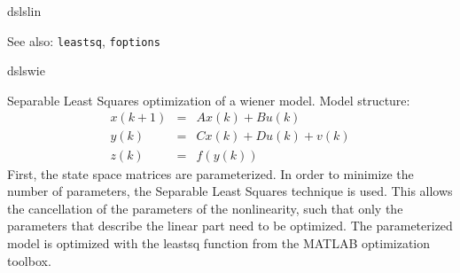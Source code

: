 \documentclass{book}
\newcommand{\foptions}{\texttt{foptions}}
\newcommand{\leastsq}{\texttt{leastsq}}
\begin{document}
\begin{command}{dslslin}
  \begin{seealso}
    See also:   {\leastsq}, {\foptions}
  \end{seealso}
\end{command}%

\begin{command}{dslswie}
\begin{purpose}
  Separable Least Squares optimization of a wiener model.  
  Model structure:
  \begin{eqnarray*}
    x(k+1) & = &  A x(k) + B u(k)\\
    y(k) & = & C x(k) + D u(k) + v(k)\\
    z(k) &=& f(y(k))
  \end{eqnarray*}
  First, the state space matrices are parameterized.  In order to
  minimize the number of parameters, the Separable Least Squares
  technique is used. This allows the cancellation of the parameters of
  the nonlinearity, such that only the parameters that describe the
  linear part need to be optimized. The parameterized model is
  optimized with the leastsq function from the MATLAB optimization
  toolbox.
\end{purpose}


\end{command}
\end{document}
